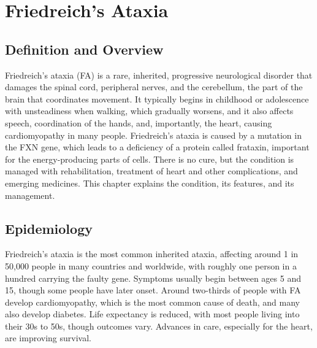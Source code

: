 \chapter{Friedreich's Ataxia}

\section*{Definition and Overview}
Friedreich's ataxia (FA) is a rare, inherited, progressive neurological disorder that damages the spinal cord, peripheral nerves, and the cerebellum, the part of the brain that coordinates movement. It typically begins in childhood or adolescence with unsteadiness when walking, which gradually worsens, and it also affects speech, coordination of the hands, and, importantly, the heart, causing cardiomyopathy in many people. Friedreich's ataxia is caused by a mutation in the FXN gene, which leads to a deficiency of a protein called frataxin, important for the energy-producing parts of cells. There is no cure, but the condition is managed with rehabilitation, treatment of heart and other complications, and emerging medicines. This chapter explains the condition, its features, and its management.

\section*{Epidemiology}
Friedreich's ataxia is the most common inherited ataxia, affecting around 1 in 50,000 people in many countries and worldwide, with roughly one person in a hundred carrying the faulty gene. Symptoms usually begin between ages 5 and 15, though some people have later onset. Around two-thirds of people with FA develop cardiomyopathy, which is the most common cause of death, and many also develop diabetes. Life expectancy is reduced, with most people living into their 30s to 50s, though outcomes vary. Advances in care, especially for the heart, are improving survival.


